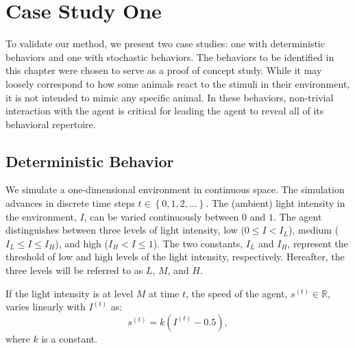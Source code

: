 
\section{Case Study One}\label{sec:case_study_one_deterministic_interaction}

To validate our method, we present two case studies: one with deterministic behaviors and one with stochastic behaviors. The behaviors to be identified in this chapter were chosen to serve as a proof of concept study. While it may loosely correspond to how some animals react to the stimuli in their environment, it is not intended to mimic any specific animal. In these behaviors, non-trivial interaction with the agent is critical for leading the agent to reveal all of its behavioral repertoire. 

\subsection{Deterministic Behavior}\label{sec:deterministic_behavior_interaction}

We simulate a one-dimensional environment in continuous space. The simulation advances in discrete time steps $t \in\left\{0,1,2,\dots\right\}$. The (ambient) light intensity in the environment, $I$, can be varied continuously between $0$ and $1$. The agent distinguishes between three levels of light intensity, low ($0 \leq I < I_L$), medium ($I_L \leq I \leq I_H$), and high ($I_H < I \leq 1$). The two constants, $I_L$ and $I_H$, represent the threshold of low and high levels of the light intensity, respectively. Hereafter, the three levels will be referred to as $L$, $M$, and $H$.

If the light intensity is at level $M$ at time $t$, the speed of the agent, $s^{\left(t\right)}\in\mathbb{R}$, varies linearly with $I^{\left(t\right)}$ as: 
\begin{equation}\label{eq:agent_behavior_linear_response}
s^{\left(t\right)}=k\left(I^{\left(t\right)}-0.5\right),
\end{equation}
where $k$ is a constant.

